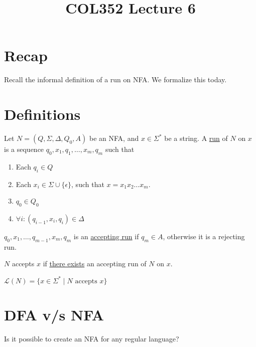 \documentclass[a4paper]{article}
\title{\textbf{COL352 Lecture 6}}
\date{}
\newcommand{\mc}{\mathcal}
\begin{document}
\maketitle
\tableofcontents

\section{Recap}

Recall the informal definition of a run on NFA. We formalize this today.

\section{Definitions}

\begin{defn}
    Let $N = (Q, \Sigma, \Delta, Q_0, A)$ be an NFA, and $x \in \Sigma^*$ be a string. A \underline{run} of $N$ on $x$ is a sequence $q_0, x_1, q_1, \ldots, x_m, q_m$ such that
    \begin{enumerate}
        \item Each $q_i \in Q$
        \item Each $x_i \in \Sigma \cup \{\epsilon\}$, such that $x = x_1x_2 \ldots x_m$.
        \item $q_0 \in Q_0$
        \item $\forall i : (q_{i - 1}, x_i, q_i) \in \Delta$
    \end{enumerate}
\end{defn}

\begin{defn}
    $q_0, x_1, \ldots, q_{m - 1}, x_m, q_m$ is an \underline{accepting run} if $q_m \in A$, otherwise it is a rejecting run.
\end{defn}

\begin{defn}
    $N$ accepts $x$ if \underline{there exists} an accepting run of $N$ on $x$.
\end{defn}

\begin{defn}
    $\mc{L}(N) = \{x \in \Sigma^* \mid N \text{ accepts } x\}$
\end{defn}

\section{DFA v/s NFA}

\begin{ques}
    Is it possible to create an NFA for any regular language?
\end{ques}
\end{document}
